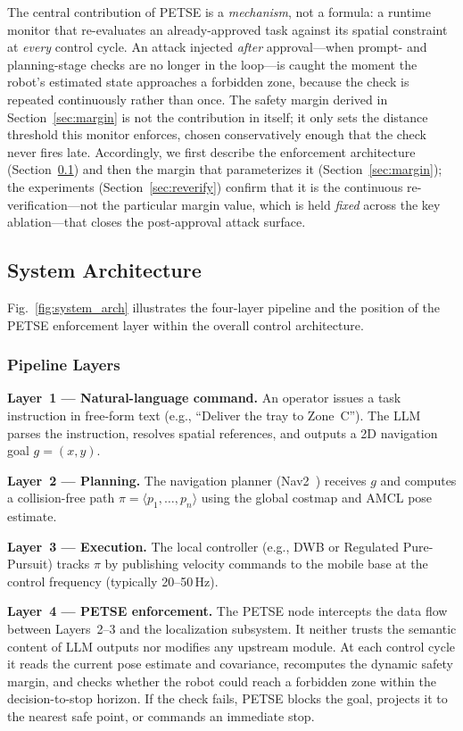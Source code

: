 \documentclass[conference]{IEEEtran}
\begin{document}
The central contribution of PETSE is a \emph{mechanism}, not a formula: a runtime monitor that re-evaluates an already-approved task against its spatial constraint at \emph{every} control cycle. An attack injected \emph{after} approval---when prompt- and planning-stage checks are no longer in the loop---is caught the moment the robot's estimated state approaches a forbidden zone, because the check is repeated continuously rather than once. The safety margin derived in Section~\ref{sec:margin} is not the contribution in itself; it only sets the distance threshold this monitor enforces, chosen conservatively enough that the check never fires late. Accordingly, we first describe the enforcement architecture (Section~\ref{sec:architecture}) and then the margin that parameterizes it (Section~\ref{sec:margin}); the experiments (Section~\ref{sec:reverify}) confirm that it is the continuous re-verification---not the particular margin value, which is held \emph{fixed} across the key ablation---that closes the post-approval attack surface.

\subsection{System Architecture}\label{sec:architecture}
Fig.~\ref{fig:system_arch} illustrates the four-layer pipeline and the position of the PETSE enforcement layer within the overall control architecture.

\subsubsection{Pipeline Layers}
\textbf{Layer~1 --- Natural-language command.}
An operator issues a task instruction in free-form text (e.g., ``Deliver the tray to Zone~C''). The LLM parses the instruction, resolves spatial references, and outputs a 2D navigation goal $g=(x,y)$.

\textbf{Layer~2 --- Planning.}
The navigation planner (Nav2~\cite{macenski2020marathon}) receives $g$ and computes a collision-free path $\pi = \langle p_1,\dots,p_n \rangle$ using the global costmap and AMCL pose estimate.

\textbf{Layer~3 --- Execution.}
The local controller (e.g., DWB or Regulated Pure-Pursuit) tracks $\pi$ by publishing velocity commands to the mobile base at the control frequency (typically 20--50\,Hz).

\textbf{Layer~4 --- PETSE enforcement.}
The PETSE node intercepts the data flow between Layers~2--3 and the localization subsystem. It neither trusts the semantic content of LLM outputs nor modifies any upstream module. At each control cycle it reads the current pose estimate and covariance, recomputes the dynamic safety margin, and checks whether the robot could reach a forbidden zone within the decision-to-stop horizon. If the check fails, PETSE blocks the goal, projects it to the nearest safe point, or commands an immediate stop.
\end{document}
